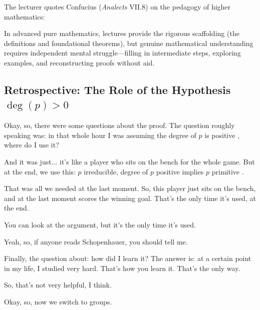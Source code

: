 \begin{insight}
The lecturer quotes Confucius (\emph{Analects} VII.8) on the pedagogy of higher mathematics:
\begin{quote}
\end{quote}
In advanced pure mathematics, lectures provide the rigorous scaffolding (the definitions and foundational theorems), but genuine mathematical understanding requires independent mental struggle---filling in intermediate steps, exploring examples, and reconstructing proofs without aid.
\end{insight}

\subsection{Retrospective: The Role of the Hypothesis \texorpdfstring{$\deg(p) > 0$}{deg(p) > 0}}

\begin{speech}[00:43:02 - 00:44:09]
Okay, so, there were some questions about the proof. The question roughly speaking was: in that whole hour I was assuming the degree of $p$ is positive , where do I use it?

And it was just... it's like a player who sits on the bench for the whole game. But at the end, we use this: $p$ irreducible, degree of $p$ positive implies $p$ primitive .

That was all we needed at the last moment. So, this player just sits on the bench, and at the last moment scores the winning goal. That's the only time it's used, at the end.

You can look at the argument, but it's the only time it's used.

Yeah, so, if anyone reads Schopenhauer, you should tell me.

Finally, the question about: how did I learn it? The answer is: at a certain point in my life, I studied very hard. That's how you learn it. That's the only way.

So, that's not very helpful, I think.

Okay, so, now we switch to groups.
\end{speech}

